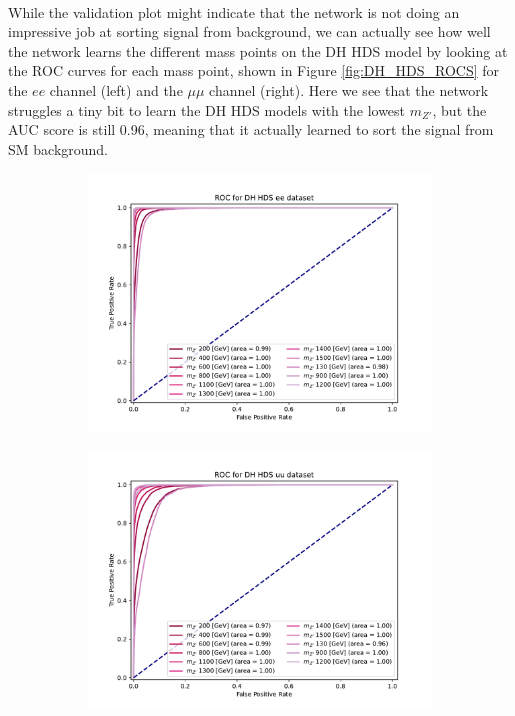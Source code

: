 \documentclass[12pt, a4paper]{book}
\begin{document}
\\While the validation plot might indicate that the network is not doing an impressive job at sorting signal from background, we can actually see how well the network learns the different mass points on the DH HDS model by looking at the ROC curves for each mass point, shown in Figure \ref{fig:DH_HDS_ROCS} for the $ee$ channel (left) and the $\mu\mu$ channel (right). 
Here we see that the network struggles a tiny bit to learn the DH HDS models with the lowest $m_{Z'}$, but the AUC score is still 0.96, meaning that it actually learned to sort the signal from SM background.\\
\begin{figure}[!ht]
	\centering
	\begin{subfigure}[b]{0.49\textwidth}
      \centering
      \includegraphics[width=1\textwidth]{XGBoost/DH_HDS/ROC_ee.pdf}
      \end{subfigure}
   \hfill
   \begin{subfigure}[b]{0.49\textwidth}
      \centering
      \includegraphics[width=1\textwidth]{XGBoost/DH_HDS/ROC_uu.pdf}

\end{subfigure}
\end{figure}
\end{document}
